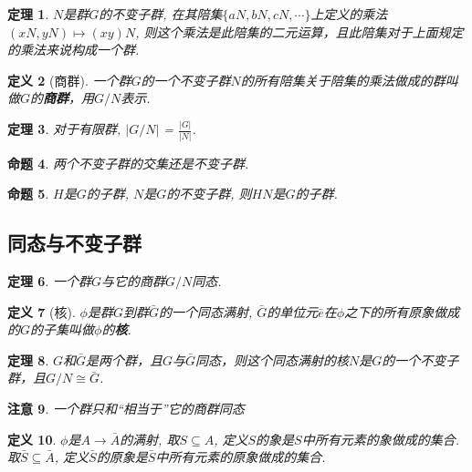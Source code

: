 \documentclass[UTF8]{ctexart}
\newtheorem{Definition}{定义}%
\newtheorem{Theorem}[Definition]{定理}
\newtheorem{Remark}[Definition]{注意}
\newtheorem{Proposition}[Definition]{命题}
\begin{document}
\begin{Theorem}
$N$是群$G$的不变子群, 在其陪集$\{ aN, bN, cN, \cdots \}$上定义的乘法$(xN, yN) \mapsto (xy)N$, 则这个乘法是此陪集的二元运算，且此陪集对于上面规定的乘法来说构成一个群.
\end{Theorem}

\begin{Definition}[商群]
一个群$G$的一个不变子群$N$的所有陪集关于陪集的乘法做成的群叫做$G$的\textbf{商群}，用$G/N$表示.
\end{Definition}

\begin{Theorem}
对于有限群, $ \displaystyle | G/N | $ = $\frac{|G|}{|N|}$.
\end{Theorem}

\begin{Proposition}
两个不变子群的交集还是不变子群.
\end{Proposition}

\begin{Proposition}
$H$是$G$的子群, $N$是$G$的不变子群, 则$HN$是$G$的子群.
\end{Proposition}

\subsection{同态与不变子群}

\begin{Theorem}
一个群$G$与它的商群$G/N$同态.
\end{Theorem}

\begin{Definition}[核]
$\phi$是群$G$到群$\bar{G}$的一个同态满射, $\bar{G}$的单位元$\bar{e}$在$\phi$之下的所有原象做成的$G$的子集叫做$\phi$的\textbf{核}.
\end{Definition}

\begin{Theorem}
$G$和$\bar{G}$是两个群，且$G$与$\bar{G}$同态，则这个同态满射的核$N$是$G$的一个不变子群，且$G/N \cong \bar{G}$.
\end{Theorem}

\begin{Remark}
一个群只和``相当于''它的商群同态
\end{Remark}

\begin{Definition}
$\phi$是$A \rightarrow \bar{A}$的满射, 取$S \subseteq A$, 定义$S$的象是$S$中所有元素的象做成的集合. 取$\bar{S} \subseteq \bar{A}$, 定义$\bar{S}$的原象是$\bar{S}$中所有元素的原象做成的集合.
\end{Definition}
\end{document}
